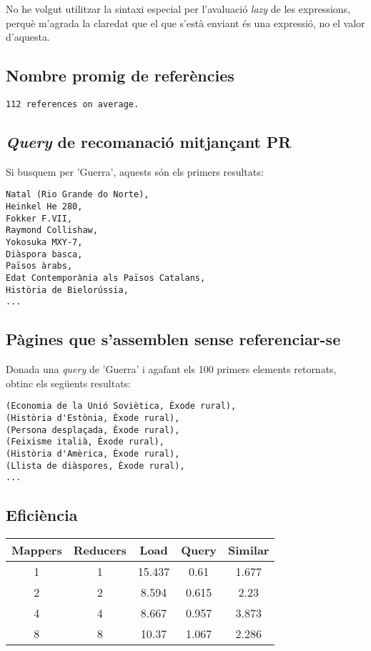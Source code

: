 \documentclass{article}
\begin{document}
No he volgut utilitzar la sintaxi especial per l'avaluació \emph{lazy} de les
expressions, perquè m'agrada la claredat que el que s'està enviant és una
expressió, no el valor d'aquesta.

\subsection{Nombre promig de referències}

\begin{verbatim}
112 references on average.
\end{verbatim}

\subsection{\emph{Query} de recomanació mitjançant PR}

Si busquem per 'Guerra', aquests són els primers resultats:

\begin{verbatim}
Natal (Rio Grande do Norte),
Heinkel He 280,
Fokker F.VII,
Raymond Collishaw,
Yokosuka MXY-7,
Diàspora basca,
Països àrabs,
Edat Contemporània als Països Catalans,
Història de Bielorússia,
...
\end{verbatim}

\subsection{Pàgines que s'assemblen sense referenciar-se}

Donada una \emph{query} de 'Guerra' i agafant els 100 primers elements retornats,
obtinc els següents resultats:

\begin{verbatim}
(Economia de la Unió Soviètica, Èxode rural),
(Història d'Estònia, Èxode rural),
(Persona desplaçada, Èxode rural),
(Feixisme italià, Èxode rural),
(Història d'Amèrica, Èxode rural),
(Llista de diàspores, Èxode rural),
...
\end{verbatim}

\subsection{Eficiència}

\begin{tabular}{|c|c|c|c|c|}
	\hline
	\textbf{Mappers} & \textbf{Reducers} & \textbf{Load} & \textbf{Query} & \textbf{Similar} \\
	\hline
	1 & 1 & 15.437 & 0.61 & 1.677 \\
	2 & 2 & 8.594 & 0.615 & 2.23 \\
	4 & 4 & 8.667 & 0.957 & 3.873 \\
	8 & 8 & 10.37 & 1.067 & 2.286 \\
	\hline
\end{tabular}
\end{document}

